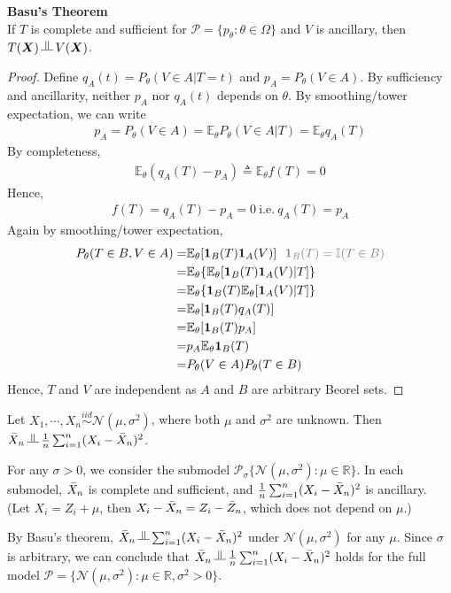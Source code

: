 \begin{theorem}
    \textbf{Basu's Theorem}\\
    If $T$ is complete and sufficient for $\mathcal{P}=\{p_\theta:\theta\in\Omega\}$
    and $V$ is ancillary, then $T(\boldsymbol{X})\vperp V(\boldsymbol{X})$.
\end{theorem}
\begin{proof}
    Define $q_A(t)=P_\theta(V\in A|T=t)$ and $p_A=P_\theta(V\in A)$.
    By sufficiency and ancillarity, neither $p_A$ nor $q_A(t)$ depends on $\theta$.
    By smoothing/tower expectation, 
    we can write
    \begin{gather}
        p_A=P_\theta(V\in A)=\mathbb{E}_\theta P_\theta(V\in A|T)=\mathbb{E}_\theta q_A(T)
    \end{gather}
    By completeness,
    \begin{gather}
        \mathbb{E}_\theta(q_A(T)-p_A)\triangleq\mathbb{E}_\theta{f(T)}=0
    \end{gather}
    Hence, 
    \begin{gather}
        f(T)=q_A(T)-p_A=0~\text{i.e.}~q_A(T)=p_A
    \end{gather}
    Again by smoothing/tower expectation,
    \begin{align}
        P_\theta(T\in B,V\in A)
        =& \mathbb{E}_\theta[\bm{1}_B(T)\bm{1}_A(V)]~~{\color{gray} \bm{1}_B(T)=\mathbb{I}(T\in B)}\\
        =& \mathbb{E}_\theta\{\mathbb{E}_\theta[\bm{1}_B(T)\bm{1}_A(V)|T]\}\\
        =& \mathbb{E}_\theta\{\bm{1}_B(T)\mathbb{E}_\theta[\bm{1}_A(V)|T]\}\\
        =& \mathbb{E}_\theta[\bm{1}_B(T)q_A(T)]\\
        =& \mathbb{E}_\theta[\bm{1}_B(T)p_A]\\
        =& p_A\mathbb{E}_\theta\bm{1}_B(T)\\
        =& P_\theta(V\in A)P_\theta(T\in B)
    \end{align}
    Hence, $T$ and $V$ are independent as $A$ and $B$ are arbitrary Beorel sets.
\end{proof}

\begin{example}
    Let $X_1,\cdots,X_n\overset{iid}{\sim}\mathcal{N}(\mu,\sigma^2)$, 
    where both $\mu$ and $\sigma^2$ are unknown. 
    Then $\Bar{X}_n\vperp\frac{1}{n}\sum_{i=1}^n(X_i-\Bar{X}_n)^2$.
    
    For any $\sigma>0$, we consider the submodel $\mathcal{P}_\sigma\{\mathcal{N}(\mu,\sigma^2):\mu\in\mathbb{R}\}$.
    In each submodel, $\Bar{X}_n$ is complete and sufficient, 
    and $\frac{1}{n}\sum_{i=1}^n(X_i-\Bar{X}_n)^2$ is ancillary. 
    (Let $X_i=Z_i+\mu$, then $X_i-\Bar{X}_n=Z_i-\Bar{Z}_n$, 
    which does not depend on $\mu$.)

    By Basu's theorem, $\Bar{X}_n\vperp\sum_{i=1}^n(X_i-\Bar{X}_n)^2$
    under $\mathcal{N}(\mu,\sigma^2)$ for any $\mu$.
    Since $\sigma$ is arbitrary, we can conclude that 
    $\Bar{X}_n\vperp\frac{1}{n}\sum_{i=1}^n(X_i-\Bar{X}_n)^2$
    holds for the full model $\mathcal{P}=\{\mathcal{N}(\mu,\sigma^2):\mu\in\mathbb{R},\sigma^2>0\}$.
\end{example}

